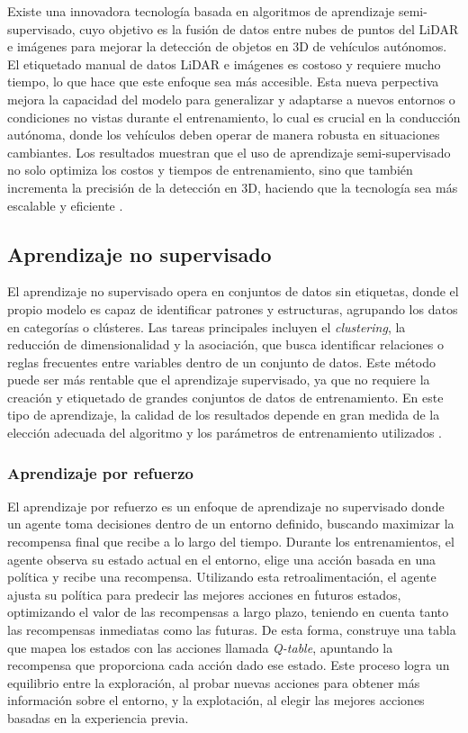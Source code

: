 Existe una innovadora tecnología basada en algoritmos de aprendizaje semi-supervisado, cuyo objetivo es la fusión de datos entre nubes de puntos del \ac{LiDAR} e imágenes para mejorar la detección de objetos en 3D de vehículos autónomos. El etiquetado manual de datos \ac{LiDAR} e imágenes es costoso y requiere mucho tiempo, lo que hace que este enfoque sea más accesible. Esta nueva perpectiva mejora la capacidad del modelo para generalizar y adaptarse a nuevos entornos o condiciones no vistas durante el entrenamiento, lo cual es crucial en la conducción autónoma, donde los vehículos deben operar de manera robusta en situaciones cambiantes. Los resultados muestran que el uso de aprendizaje semi-supervisado no solo optimiza los costos y tiempos de entrenamiento, sino que también incrementa la precisión de la detección en 3D, haciendo que la tecnología sea más escalable y eficiente \cite{semi-ex}.

\subsection{Aprendizaje no supervisado}

El aprendizaje no supervisado opera en conjuntos de datos sin etiquetas, donde el propio modelo es capaz de identificar patrones y estructuras, agrupando los datos en categorías o clústeres. Las tareas principales incluyen el \textit{clustering}, la reducción de dimensionalidad y la asociación, que busca identificar relaciones o reglas frecuentes entre variables dentro de un conjunto de datos. Este método puede ser más rentable que el aprendizaje supervisado, ya que no requiere la creación y etiquetado de grandes conjuntos de datos de entrenamiento. En este tipo de aprendizaje, la calidad de los resultados depende en gran medida de la elección adecuada del algoritmo y los parámetros de entrenamiento utilizados \cite{no-supervised-learning}.

\subsubsection{Aprendizaje por refuerzo}

El aprendizaje por refuerzo es un enfoque de aprendizaje no supervisado donde un agente toma decisiones dentro de un entorno definido, buscando maximizar la recompensa final que recibe a lo largo del tiempo. Durante los entrenamientos, el agente observa su estado actual en el entorno, elige una acción basada en una política y recibe una recompensa. Utilizando esta retroalimentación, el agente ajusta su política para predecir las mejores acciones en futuros estados, optimizando el valor de las recompensas a largo plazo, teniendo en cuenta tanto las recompensas inmediatas como las futuras. De esta forma, construye una tabla que mapea los estados con las acciones llamada \textit{Q-table}, apuntando la recompensa que proporciona cada acción dado ese estado. Este proceso logra un equilibrio entre la exploración, al probar nuevas acciones para obtener más información sobre el entorno, y la explotación, al elegir las mejores acciones basadas en la experiencia previa.

